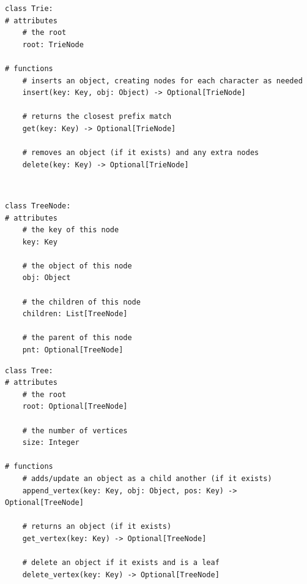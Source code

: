 \documentclass[mathserif, handout]{beamer}
\begin{document}
\begin{frame}[fragile]
  \vspace{-5mm}
  \begin{thmboxbot}
    \begin{lstlisting}[style=mypython]
class Trie:
# attributes
    # the root
    root: TrieNode

# functions
    # inserts an object, creating nodes for each character as needed
    insert(key: Key, obj: Object) -> Optional[TrieNode]

    # returns the closest prefix match
    get(key: Key) -> Optional[TrieNode]

    # removes an object (if it exists) and any extra nodes
    delete(key: Key) -> Optional[TrieNode]
\end{lstlisting}
  \end{thmboxbot}
\end{frame}


\begin{frame}[fragile]
  \begin{thmboxtop}
     \\
    \begin{lstlisting}[style=mypython]
class TreeNode:
# attributes
    # the key of this node
    key: Key
    
    # the object of this node
    obj: Object

    # the children of this node 
    children: List[TreeNode]

    # the parent of this node
    pnt: Optional[TreeNode]
\end{lstlisting}
  \end{thmboxtop}
\end{frame}

\begin{frame}[fragile]
  \vspace{-5mm}
  \begin{thmboxtop}
    \begin{lstlisting}[style=mypython]
class Tree:
# attributes
    # the root
    root: Optional[TreeNode]

    # the number of vertices
    size: Integer

# functions
    # adds/update an object as a child another (if it exists)
    append_vertex(key: Key, obj: Object, pos: Key) -> Optional[TreeNode]

    # returns an object (if it exists)
    get_vertex(key: Key) -> Optional[TreeNode]

    # delete an object if it exists and is a leaf
    delete_vertex(key: Key) -> Optional[TreeNode]
\end{lstlisting}
  \end{thmboxtop}
\end{frame}
\end{document}
